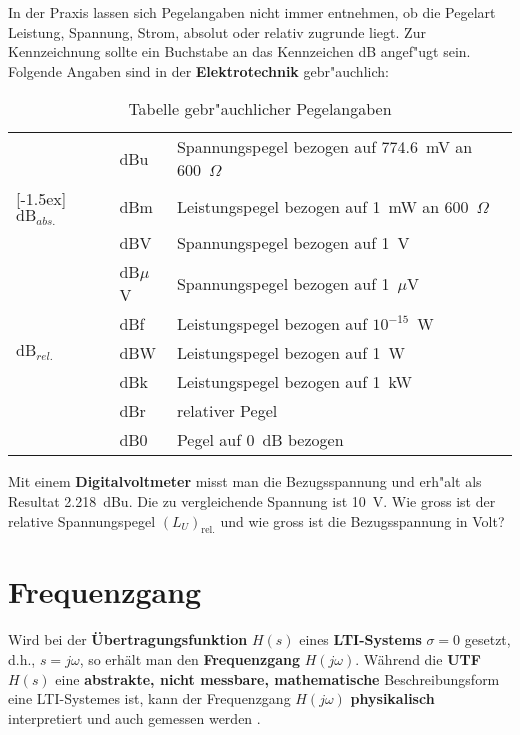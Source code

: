 {\newpage
\nit In der Praxis lassen sich Pegelangaben nicht immer entnehmen, ob die
Pegelart Leistung, Spannung, Strom, absolut oder relativ zugrunde
liegt. Zur Kennzeichnung sollte ein Buchstabe an das Kennzeichen dB
angef"ugt sein. Folgende Angaben sind in der {\bf Elektrotechnik} gebr"auchlich:\\ 
\begin{table}[htb]
\begin{center}\vspace*{-2mm}
\begin{tabular}{|l|l|l|}\hline
  & dBu & Spannungspegel bezogen auf 774.6~mV an 600~$\Omega$\\ \cline{2-3}
 \multicolumn{1}{|l|}{\raisebox{1.5ex}[-1.5ex]{$\mbox{dB}_{abs.}$}} & dBm & Leistungspegel bezogen auf 1~mW an 600~$\Omega$\\ \hline\hline
  & dBV & Spannungspegel bezogen auf 1~V\\ \cline{2-3}
  & dB$\mu$V & Spannungspegel bezogen auf 1~$\mu$V\\ \cline{2-3}
  & dBf & Leistungspegel bezogen auf $10^{-15}$~W\\ \cline{2-3} 
\multicolumn{1}{|l|}{$\mbox{dB}_{rel.}$}  & dBW & Leistungspegel bezogen auf 1~W\\ \cline{2-3}
  & dBk & Leistungspegel bezogen auf 1~kW\\ \cline{2-3}
  & dBr & relativer Pegel\\ \cline{2-3}
  & dB0 & Pegel auf 0~dB bezogen\\ \hline
\end{tabular}\caption{Tabelle  gebr"auchlicher  Pegelangaben}
\end{center}
\end{table}

\aufg
Mit einem {\bf Digitalvoltmeter} misst man die
Bezugsspannung und erh"alt als Resultat 2.218~dBu. Die zu
vergleichende Spannung ist 10~V. Wie gross ist der relative
Spannungspegel $(L_U)_{\mbox{rel.}}$ und wie gross ist die
Bezugsspannung in Volt?\vspace*{1cm}

\newpage
\section{Frequenzgang}
Wird bei der {\bf
  \"Ubertragungsfunktion}
{\boldmath $H(s)$} eines {\bf LTI-Systems}
{\boldmath $\sigma=0$} gesetzt, d.h., {\boldmath $s=j\omega$}, so
erh\"alt man den {\bf Frequenzgang} {\boldmath
  $H(j\omega)$}. W\"ahrend die {\bf UTF} $H(s)$ eine {\bf
  abstrakte, nicht messbare, mathematische} Beschreibungsform eine
LTI-Systemes ist, kann der Frequenzgang $H(j\omega)$ {\bf
  physikalisch} interpretiert und auch gemessen werden \cite{UNB:81}.
}
